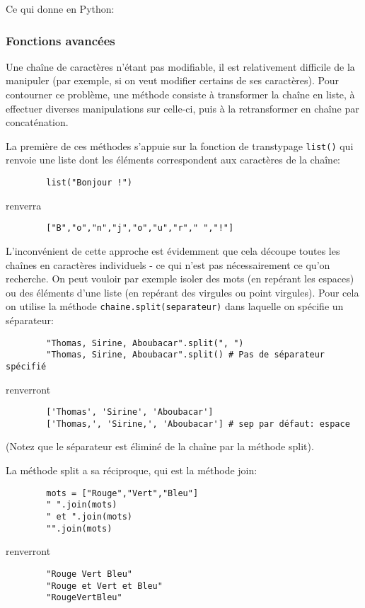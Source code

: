 \documentclass[12pt]{article}
\begin{document}
\begin{MaReponse}
\begin{alphenum}
		Ce qui donne en Python:
		\end{alphenum}
	\end{MaReponse}
	
	\subsubsection*{Fonctions avancées}
	Une chaîne de caractères n'étant pas modifiable, il est relativement difficile de la manipuler (par exemple, si on veut modifier certains de ses caractères). Pour contourner ce problème, une méthode consiste à transformer la chaîne en liste, à effectuer diverses manipulations sur celle-ci, puis à la retransformer en chaîne par concaténation.
	
	La première de ces méthodes s'appuie sur la fonction de transtypage \texttt{list()} qui renvoie une liste dont les éléments correspondent aux caractères de la chaîne:
	\begin{verbatim}
		list("Bonjour !")
	\end{verbatim}
	renverra
	\begin{verbatim}
		["B","o","n","j","o","u","r"," ","!"]
	\end{verbatim}
	L'inconvénient de cette approche est évidemment que cela découpe toutes les chaînes en caractères individuels - ce qui n'est pas nécessairement ce qu'on recherche. On peut vouloir par exemple isoler des mots (en repérant les espaces) ou des éléments d'une liste (en repérant des virgules ou point virgules). Pour cela on utilise la méthode \texttt{chaine.split(separateur)} dans laquelle on spécifie un séparateur:
	\begin{verbatim}
		"Thomas, Sirine, Aboubacar".split(", ")
		"Thomas, Sirine, Aboubacar".split() # Pas de séparateur spécifié
	\end{verbatim}
	renverront
	\begin{verbatim}
		['Thomas', 'Sirine', 'Aboubacar']
		['Thomas,', 'Sirine,', 'Aboubacar'] # sep par défaut: espace
	\end{verbatim}
	(Notez que le séparateur est éliminé de la chaîne par la méthode split).
	
	La méthode split a sa réciproque, qui est la méthode join:
	\begin{verbatim}
		mots = ["Rouge","Vert","Bleu"]
		" ".join(mots)
		" et ".join(mots)
		"".join(mots)
	\end{verbatim}
	renverront
	\begin{verbatim}
		"Rouge Vert Bleu"
		"Rouge et Vert et Bleu"
		"RougeVertBleu"
	\end{verbatim}
	
\end{document}
